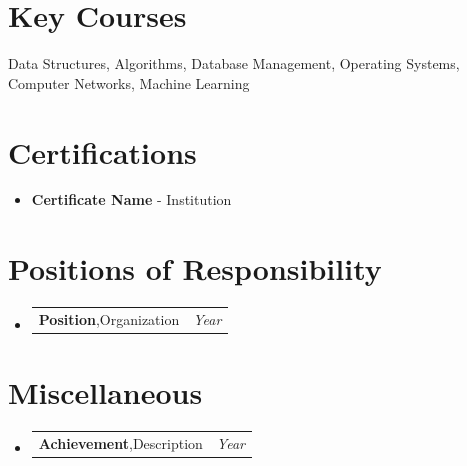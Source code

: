 \documentclass[a4paper,11pt]{article}
\makeatletter
\newcommand{\resumePOR}[3]{
\vspace{0.5mm}\item
    \begin{tabular*}{0.97\textwidth}[t]{l@{\extracolsep{\fill}}r}
        \textbf{#1},\hspace{0.3mm}#2 & \textit{\small{#3}} 
    \end{tabular*}
}
\newcommand{\resumeSubHeadingListStart}{\begin{itemize}[leftmargin=*,labelsep=0mm]}
\newcommand{\resumeItemListStart}{\begin{itemize}[leftmargin=3ex, rightmargin=2ex, noitemsep,labelsep=1.2mm,itemsep=0mm]\small}
\newcommand{\resumeSubHeadingListEnd}{\end{itemize}\vspace{2mm}}
\newcommand{\resumeItemListEnd}{\end{itemize}\vspace{-2mm}}
\makeatother
\begin{document}
\section{Key Courses}
Data Structures, Algorithms, Database Management, Operating Systems, Computer Networks, Machine Learning

\section{Certifications}
    \resumeItemListStart
        \item \textbf{Certificate Name} - Institution
    \resumeItemListEnd

\section{Positions of Responsibility}
  \resumeSubHeadingListStart
  \resumePOR{Position}{Organization}{Year}
  \resumeSubHeadingListEnd

\section{Miscellaneous}
\resumeSubHeadingListStart
\resumePOR{Achievement}{Description}{Year}
\resumeSubHeadingListEnd
\end{document}
